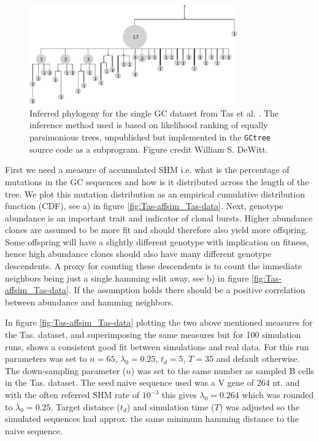 \begin{figure}[!ht]
    \centering
    \includegraphics[width=0.8\textwidth]{figures/Tas_tree.pdf}
    \caption{
        \label{fig:Tas_tree}
        Inferred phylogeny for the single GC dataset from Tas et al. \cite{tas2016visualizing}.
        The inference method used is based on likelihood ranking of equally parsimonious trees, unpublished but implemented in the \texttt{GCtree} source code as a subprogram.
        Figure credit William S. DeWitt.
    }
\end{figure}


First we need a measure of accumulated SHM i.e. what is the percentage of mutations in the GC sequences and how is it distributed across the length of the tree.
We plot this mutation distribution as an empirical cumulative distribution function (CDF), see a) in figure \ref{fig:Tas-affsim_Tas-data}.
Next, genotype abundance is an important trait and indicator of clonal bursts.
Higher abundance clones are assumed to be more fit and should therefore also yield more offspring.
Some offspring will have a slightly different genotype with implication on fitness, hence high abundance clones should also have many different genotype descendents.
A proxy for counting these descendents is to count the immediate neighbors being just a single hamming edit away, see b) in figure \ref{fig:Tas-affsim_Tas-data}.
If the assumption holds there should be a positive correlation between abundance and hamming neighbors.

In figure \ref{fig:Tas-affsim_Tas-data} plotting the two above mentioned measures for the Tas. dataset, and superimposing the same measures but for 100 simulation runs, shows a consistent good fit between simulations and real data.
For this run parameters was set to $n=65$, $\lambda_0=0.25$, $t_d=5$, $T=35$ and default otherwise.
The down-sampling parameter ($n$) was set to the same number as sampled B cells in the Tas. dataset.
The seed naive sequence used was a V gene of 264 nt. and with the often referred SHM rate of $10^{-3}$ \cite{victora2012germinal} this gives $\lambda_0=0.264$ which was rounded to $\lambda_0=0.25$.
Target distance ($t_d$) and simulation time ($T$) was adjusted so the simulated sequences had approx. the same minimum hamming distance to the naive sequence.

